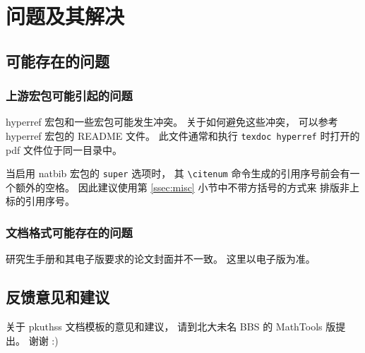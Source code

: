 
\chapter{问题及其解决}
	\section{可能存在的问题}
		\subsection{上游宏包可能引起的问题}

		hyperref 宏包和一些宏包可能发生冲突。
		关于如何避免这些冲突，
		可以参考 hyperref 宏包的 README 文件。
		此文件通常和执行 \verb|texdoc hyperref| %
		时打开的 pdf 文件位于同一目录中。

		当启用 natbib 宏包的 \verb|super| 选项时，
		其 \verb|\citenum| 命令生成的引用序号前会有一个额外的空格。
		因此建议使用第 \ref{ssec:misc} 小节中不带方括号的方式来%
		排版非上标的引用序号。

		\subsection{文档格式可能存在的问题}

		研究生手册和其电子版\cite{pku-thesisstyle}要求的论文封面并不一致。
		这里以电子版为准。

	\section{反馈意见和建议}

	关于 pkuthss 文档模板的意见和建议，
	请到北大未名 BBS 的 MathTools 版提出。
	谢谢 :)

